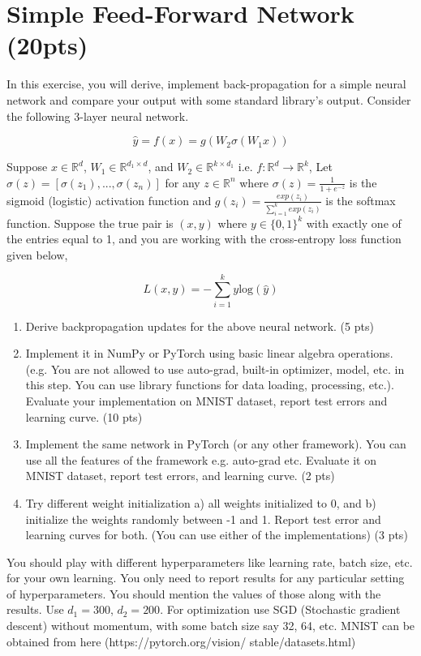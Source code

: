 \documentclass[a4paper]{article}
\theoremstyle{definition}
\begin{document}


\section{Simple Feed-Forward Network (20pts)}
In this exercise, you will derive, implement back-propagation for a simple neural network and compare your output with some standard library’s output. Consider the following 3-layer neural network.

\[
\hat{y} = f(x) = g(W_2\sigma(W_1x))
\]

Suppose $x \in \mathbb{R}^d$, $W_1 \in \mathbb{R}^{d_1 \times d}$, and $W_2 \in \mathbb{R}^{k \times d_1}$ i.e. $f: \mathbb{R}^d \rightarrow \mathbb{R}^k$, Let $\sigma(z) = [\sigma(z_1), ..., \sigma(z_n)]$ for any $z \in \mathbb{R}^n$ where $\sigma(z) = \frac{1}{1 + e^{-z}}$ is the sigmoid (logistic) activation function and $g(z_i) = \frac{exp(z_i)}{\sum_{i=1}^k exp(z_i)}$ is the softmax function. Suppose the true pair is $(x, y)$ where $y \in \{0, 1\}^k$ with exactly one of the entries equal to 1, and you are working with the cross-entropy loss function given below,

\[
L(x, y) = -\sum_{i=1}^k y \text{log}(\hat{y})
\]

\begin{enumerate}
    \item Derive backpropagation updates for the above neural network. (5 pts)
    \item Implement it in NumPy or PyTorch using basic linear algebra operations. (e.g. You are not allowed to use auto-grad, built-in optimizer, model, etc. in this step. You can use library functions for data loading, processing, etc.). Evaluate your implementation on MNIST dataset, report test errors and learning curve. (10 pts)
    \item Implement the same network in PyTorch (or any other framework). You can use all the features of the framework e.g. auto-grad etc. Evaluate it on MNIST dataset, report test errors, and learning curve. (2 pts)
    \item Try different weight initialization a) all weights initialized to 0, and b) initialize the weights randomly between -1 and 1. Report test error and learning curves for both. (You can use either of the implementations) (3 pts)
\end{enumerate}

You should play with different hyperparameters like learning rate, batch size, etc. for your own learning. You only need to report results for any particular setting of hyperparameters. You should mention the values of those along with the results. Use $d_1 = 300$, $d_2 = 200$. For optimization use SGD (Stochastic gradient descent) without momentum, with some batch size say 32, 64, etc. MNIST can be obtained from here (https://pytorch.org/vision/ stable/datasets.html)


\end{document}
